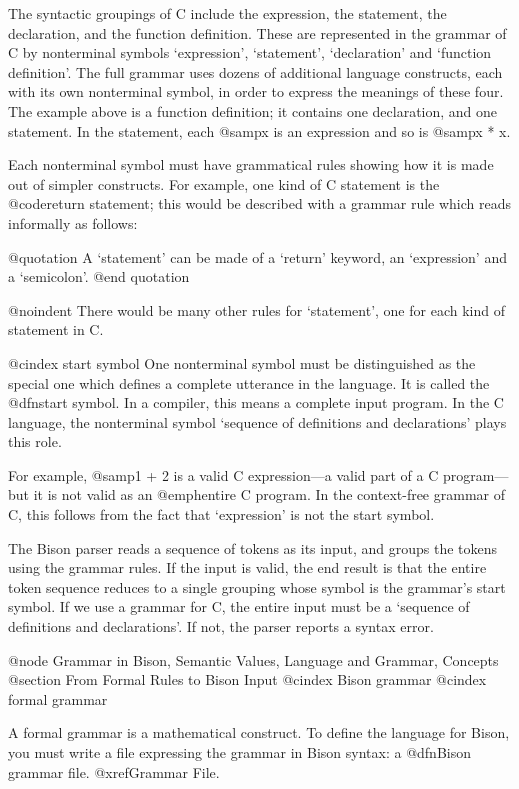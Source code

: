 The syntactic groupings of C include the expression, the statement, the
declaration, and the function definition.  These are represented in the
grammar of C by nonterminal symbols `expression', `statement',
`declaration' and `function definition'.  The full grammar uses dozens of
additional language constructs, each with its own nonterminal symbol, in
order to express the meanings of these four.  The example above is a
function definition; it contains one declaration, and one statement.  In
the statement, each @samp{x} is an expression and so is @samp{x * x}.

Each nonterminal symbol must have grammatical rules showing how it is made
out of simpler constructs.  For example, one kind of C statement is the
@code{return} statement; this would be described with a grammar rule which
reads informally as follows:

@quotation
A `statement' can be made of a `return' keyword, an `expression' and a
`semicolon'.
@end quotation

@noindent
There would be many other rules for `statement', one for each kind of
statement in C.

@cindex start symbol
One nonterminal symbol must be distinguished as the special one which
defines a complete utterance in the language.  It is called the @dfn{start
symbol}.  In a compiler, this means a complete input program.  In the C
language, the nonterminal symbol `sequence of definitions and declarations'
plays this role.

For example, @samp{1 + 2} is a valid C expression---a valid part of a C
program---but it is not valid as an @emph{entire} C program.  In the
context-free grammar of C, this follows from the fact that `expression' is
not the start symbol.

The Bison parser reads a sequence of tokens as its input, and groups the
tokens using the grammar rules.  If the input is valid, the end result is
that the entire token sequence reduces to a single grouping whose symbol is
the grammar's start symbol.  If we use a grammar for C, the entire input
must be a `sequence of definitions and declarations'.  If not, the parser
reports a syntax error.

@node Grammar in Bison, Semantic Values, Language and Grammar, Concepts
@section From Formal Rules to Bison Input
@cindex Bison grammar
@cindex formal grammar

A formal grammar is a mathematical construct.  To define the language
for Bison, you must write a file expressing the grammar in Bison syntax:
a @dfn{Bison grammar} file.  @xref{Grammar File}.

